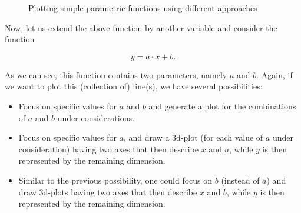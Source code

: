 \documentclass{article}
\begin{document}
\begin{figure}[ht]
  \centering
  \caption{Plotting simple parametric functions using different approaches}
  \label{fig:simple-parametric-functions}
\end{figure}

Now, let us extend the above function by another variable and consider the function

\begin{equation*}
  y = a\cdot x+b.
\end{equation*}

As we can see, this function contains two parameters, namely $a$ and $b$. Again, if we want to plot this (collection of) line(s), we have several possibilities:

\begin{itemize}
\item Focus on specific values for $a$ and $b$ and generate a plot for the combinations of $a$ and $b$ under considerations.
\item Focus on specific values for $a$, and draw a 3d-plot (for each value of $a$ under consideration) having two axes that then describe $x$ and $a$, while $y$ is then represented by the remaining dimension.
\item Similar to the previous possibility, one could focus on $b$ (instead of $a$) and draw 3d-plots having two axes that then describe $x$ and $b$, while $y$ is then represented by the remaining dimension.
\end{itemize}
\end{document}
